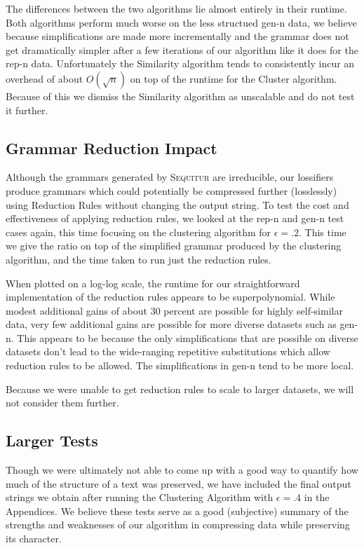 \documentclass[11pt]{article}
\newcommand{\Sequitur}{\textsc{Sequitur}\xspace}
\begin{document}
The differences between the two algorithms lie almost entirely in their
runtime. Both algorithms perform much worse on the less structued gen-n data,
we believe because simplifications are made more incrementally and the grammar
does not get dramatically simpler after a few iterations of our algorithm like
it does for the rep-n data.  Unfortunately the Similarity algorithm tends to
consistently incur an overhead of about $O(\sqrt{n})$ on top of the runtime for
the Cluster algorithm. Because of this we dismiss the Similarity algorithm as
unscalable and do not test it further.

\subsection{Grammar Reduction Impact}

Although the grammars generated by \Sequitur are irreducible, our lossifiers
produce grammars which could potentially be compressed further (losslessly)
using Reduction Rules without changing the output string. To test the cost and
effectiveness of applying reduction rules, we looked at the rep-n and gen-n
test cases again, this time focusing on the clustering algorithm for $\epsilon
= .2$. This time we give the ratio on top of the simplified grammar produced by
the clustering algorithm, and the time taken to run just the reduction rules.

When plotted on a log-log scale, the runtime for our straightforward
implementation of the reduction rules appears to be superpolynomial. While
modest additional gains of about 30 percent are possible for highly
self-similar data, very few additional gains are possible for more diverse
datasets such as gen-n. This appears to be because the only simplifications
that are possible on diverse datasets don't lead to the wide-ranging repetitive
substitutions which allow reduction rules to be allowed.  The simplifications
in gen-n tend to be more local.

Because we were unable to get reduction rules to scale to larger datasets, we
will not consider them further.

\subsection{Larger Tests}

Though we were ultimately not able to come up with a good way to quantify how
much of the structure of a text was preserved, we have included the final
output strings we obtain after running the Clustering Algorithm with $\epsilon
= .4$ in the Appendices. We believe these tests serve as a good (subjective)
summary of the strengths and weaknesses of our algorithm in compressing data
while preserving its character.
\end{document}
